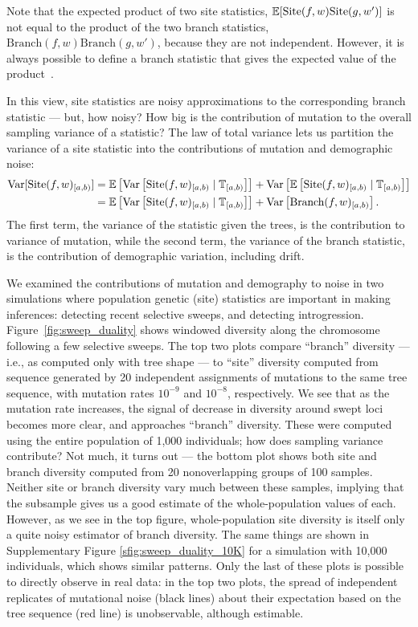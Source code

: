 \documentclass{article}
\newcommand{\branch}{\mbox{Branch}} %
\newcommand{\site}{\mbox{Site}} %
\newcommand{\given}{\;\vert\;}
\newcommand{\treeseq}{\mathbb{T}} %
\newcommand{\iw}{w} %
\begin{document}
Note that the expected product of two site statistics,
$\E[\site(f, \iw) \site(g, \iw')]$
is not equal to the product of the two branch statistics, $\branch(f, \iw) \branch(g, \iw')$,
because they are not independent.
However, it is always possible to define a branch statistic that
gives the expected value of the product~\citep{ralph2019empirical}.

In this view,
site statistics are noisy approximations to the corresponding branch statistic
--- but, how noisy?
How big is the contribution of mutation to the overall sampling variance of a statistic?
The law of total variance lets us partition the variance of a site statistic
into the contributions of mutation and demographic noise:
\begin{align*}
    \var[\site(f, \iw)_{[a,b)}]
    &=
        \E\left[ \var\left[\site(f, \iw)_{[a,b)} \given \treeseq_{[a,b)}\right] \right]
        + \var\left[ \E\left[\site(f, \iw)_{[a,b)} \given \treeseq_{[a,b)}\right] \right] \\
    &=
        \E\left[ \var\left[\site(f, \iw)_{[a,b)} \given \treeseq_{[a,b)}\right] \right]
        + \var\left[ \branch(f, \iw)_{[a,b)} \right] .
\end{align*}
The first term, the variance of the statistic given the trees,
is the contribution to variance of mutation,
while the second term, the variance of the branch statistic,
is the contribution of demographic variation, including drift.


We examined the contributions of mutation and demography to noise
in two simulations where population genetic (site) statistics
are important in making inferences:
detecting recent selective sweeps,
and detecting introgression.
Figure~\ref{fig:sweep_duality} shows windowed
diversity along the chromosome following a few selective sweeps.
The top two plots compare ``branch'' diversity --- i.e., as computed only with tree shape ---
to ``site'' diversity computed from sequence generated by 20 independent assignments of mutations to the same tree sequence,
with mutation rates $10^{-9}$ and $10^{-8}$, respectively.
We see that as the mutation rate increases, the signal of decrease in diversity around swept loci becomes more clear,
and approaches ``branch'' diversity.
These were computed using the entire population of 1,000 individuals;
how does sampling variance contribute?
Not much, it turns out --- the bottom plot shows both site and branch diversity
computed from 20 nonoverlapping groups of 100 samples.
Neither site or branch diversity vary much between these samples,
implying that the subsample gives us a good estimate of the whole-population values of each.
However, as we see in the top figure,
whole-population site diversity is itself only a quite noisy estimator of branch diversity.
The same things are shown in Supplementary Figure \ref{sfig:sweep_duality_10K}
for a simulation with 10,000 individuals, which shows similar patterns.
Only the last of these plots is possible to directly observe in real data:
in the top two plots,
the spread of independent replicates of mutational noise (black lines)
about their expectation based on the tree sequence (red line)
is unobservable, although estimable.
\end{document}
